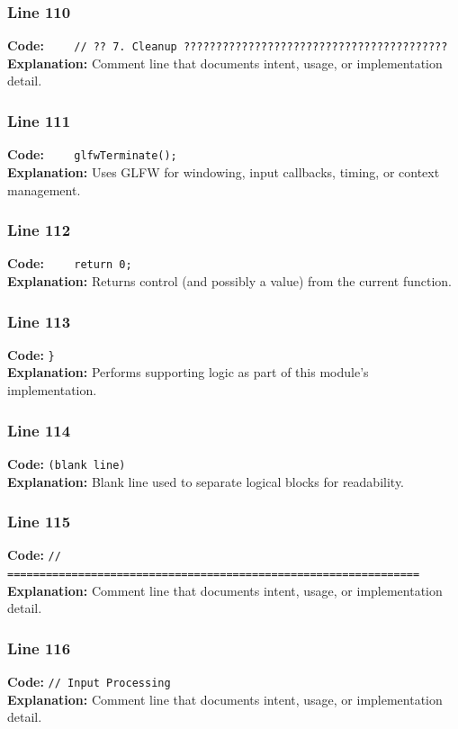 \documentclass[11pt,a4paper]{article}
\begin{document}
\subsubsection*{Line 110}
\textbf{Code:} \verb|    // ?? 7. Cleanup ?????????????????????????????????????????|\\
\textbf{Explanation:} Comment line that documents intent, usage, or implementation detail.

\subsubsection*{Line 111}
\textbf{Code:} \verb|    glfwTerminate();|\\
\textbf{Explanation:} Uses GLFW for windowing, input callbacks, timing, or context management.

\subsubsection*{Line 112}
\textbf{Code:} \verb|    return 0;|\\
\textbf{Explanation:} Returns control (and possibly a value) from the current function.

\subsubsection*{Line 113}
\textbf{Code:} \verb|}|\\
\textbf{Explanation:} Performs supporting logic as part of this module's implementation.

\subsubsection*{Line 114}
\textbf{Code:} \texttt{(blank line)}\\
\textbf{Explanation:} Blank line used to separate logical blocks for readability.

\subsubsection*{Line 115}
\textbf{Code:} \verb|// ================================================================|\\
\textbf{Explanation:} Comment line that documents intent, usage, or implementation detail.

\subsubsection*{Line 116}
\textbf{Code:} \verb|// Input Processing|\\
\textbf{Explanation:} Comment line that documents intent, usage, or implementation detail.
\end{document}
